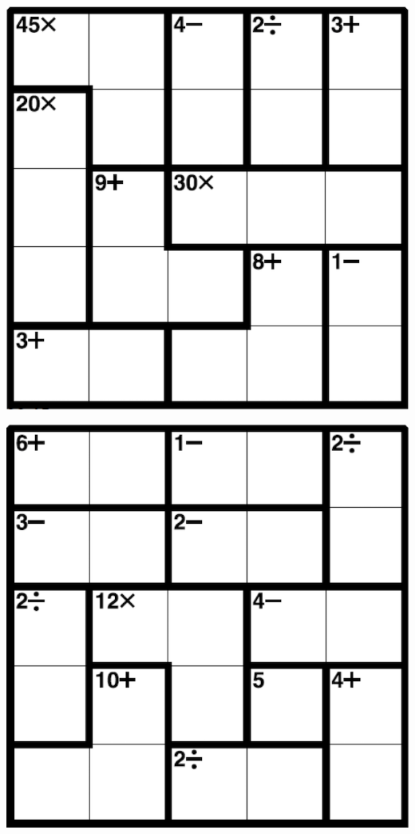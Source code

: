 
\includegraphics[scale=1]{Gambar/Lampiran/5x5_11.png}

\includegraphics[scale=1]{Gambar/Lampiran/5x5_12.png}
